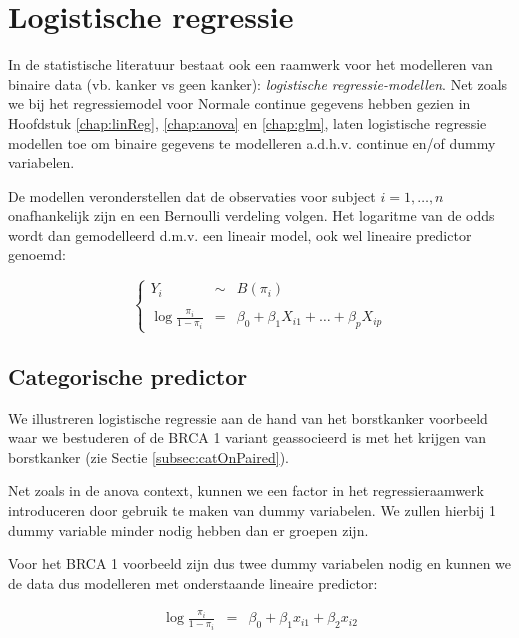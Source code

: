 \documentclass[
  12pt,dutch,coursenotes]{book}
\theoremstyle{definition}
\theoremstyle{definition}
\theoremstyle{definition}
\theoremstyle{remark}
\begin{document}
\hypertarget{logistische-regressie}{%
\section{Logistische regressie}\label{logistische-regressie}}

In de statistische literatuur bestaat ook een raamwerk voor het modelleren van binaire data (vb. kanker vs geen kanker): \emph{logistische regressie-modellen}.
Net zoals we bij het regressiemodel voor Normale continue gegevens hebben gezien in Hoofdstuk \ref{chap:linReg}, \ref{chap:anova} en \ref{chap:glm}, laten logistische regressie modellen toe om binaire gegevens te modelleren a.d.h.v. continue en/of dummy variabelen.

De modellen veronderstellen dat de observaties voor subject \(i=1,\ldots,n\) onafhankelijk zijn en een Bernoulli verdeling volgen. Het logaritme van de odds wordt dan gemodelleerd d.m.v. een lineair model, ook wel lineaire predictor genoemd:

\begin{equation}
\left\{
\begin{array}{ccl}
Y_i&\sim&B(\pi_i)\\\\
\log \frac{\pi_i}{1-\pi_i}&=&\beta_0 + \beta_1X_{i1} + \ldots + \beta_p X_{ip}
\end{array}\right.
\end{equation}

\hypertarget{categorische-predictor}{%
\subsection{Categorische predictor}\label{categorische-predictor}}

We illustreren logistische regressie aan de hand van het borstkanker voorbeeld waar we bestuderen of de BRCA 1 variant geassocieerd is met het krijgen van borstkanker (zie Sectie \ref{subsec:catOnPaired}).

Net zoals in de anova context, kunnen we een factor in het regressieraamwerk introduceren door gebruik te maken van dummy variabelen.
We zullen hierbij 1 dummy variable minder nodig hebben dan er groepen zijn.

Voor het BRCA 1 voorbeeld zijn dus twee dummy variabelen nodig en kunnen we de data dus modelleren met onderstaande lineaire predictor:

\begin{eqnarray*}
  \log \frac{\pi_i}{1-\pi_i} &=& \beta_0+\beta_1 x_{i1} +\beta_2 x_{i2}
\end{eqnarray*}
\end{document}
